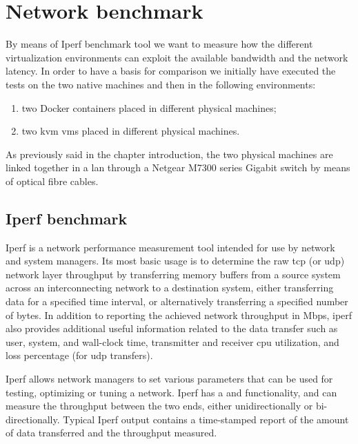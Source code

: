 %
%
\section{Network benchmark}
\label{sec:measurements-network}
By means of Iperf benchmark tool we want to measure how the different virtualization environments
can exploit the available bandwidth and the network latency. In order to have a basis for comparison 
we initially have executed the tests on the two native machines and then in the following environments:

\begin{enumerate}
	\item{two Docker containers placed in different physical machines;}
	\item{two \ac{kvm} \ac{vm}s placed in different physical machines.}
\end{enumerate}

As previously said in the chapter introduction, the two physical machines are linked together in a \acs{lan}
through a Netgear M7300 series Gigabit switch by means of optical fibre cables.

\subsection{Iperf benchmark}
\label{sec:measurements-network-nuttcp}
Iperf is a network performance measurement tool intended for use by network and system managers. Its
most basic usage is to determine the raw \acs{tcp} (or \acs{udp}) network layer throughput by transferring
memory buffers from a source system across an interconnecting network to a destination system, either
transferring data for a specified time interval, or alternatively transferring a specified number of bytes.
In addition to reporting the achieved network throughput in Mbps, iperf also provides additional useful
information related to the data transfer such as user, system, and wall-clock time, transmitter and receiver
\acs{cpu} utilization, and loss percentage (for \acs{udp} transfers).

Iperf allows network managers to set various parameters that can be used for testing, optimizing
or tuning a network. Iperf has a  and  functionality, and can
measure the throughput between the two ends, either unidirectionally or bi-directionally. Typical Iperf output
contains a time-stamped report of the amount of data transferred and the throughput measured.

